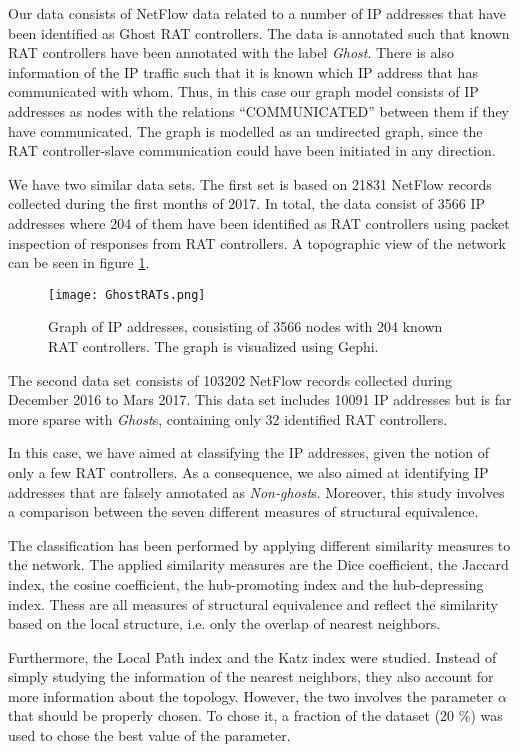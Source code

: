 Our data consists of NetFlow data related to a number of IP addresses that have been identified as Ghost RAT controllers. The data is annotated such that known RAT controllers have been annotated with the label \textit{Ghost}. There is also information of the IP traffic such that it is known which IP address that has communicated with whom. Thus, in this case our graph model consists of IP addresses as nodes with the relations ``COMMUNICATED'' between them if they have communicated. The graph is modelled as an undirected graph, since the RAT controller-slave communication could have been initiated in any direction.

We have two similar data sets. The first set is based on 21831 NetFlow records collected during the first months of 2017. In total, the data consist of 3566 IP addresses where 204 of them have been identified as RAT controllers using packet inspection of responses from RAT controllers. A topographic view of the network can be seen in figure \ref{ip1}.

\begin{figure}[h!]
    \centering
    \texttt{[image: GhostRATs.png]}
    \caption{Graph of IP addresses, consisting of 3566 nodes with 204 known RAT controllers. The graph is visualized using Gephi.}
    \label{ip1}
\end{figure}

The second data set consists of 103202 NetFlow records collected during December 2016 to Mars 2017. This data set includes 10091 IP addresses but is far more sparse with \textit{Ghost}s, containing only 32 identified RAT controllers. 

In this case, we have aimed at classifying the IP addresses, given the notion of only a few RAT controllers. As a consequence, we also aimed at identifying IP addresses that are falsely annotated as \textit{Non-ghost}s. Moreover, this study involves a comparison between the seven different measures of structural equivalence. 

The classification has been performed by applying different similarity measures to the network. The applied similarity measures are the Dice coefficient, the Jaccard index, the cosine coefficient, the hub-promoting index and the hub-depressing index. Thess are all measures of structural equivalence and reflect the similarity based on the local structure, i.e. only the overlap of nearest neighbors.

Furthermore, the Local Path index and the Katz index were studied. Instead of simply studying the information of the nearest neighbors, they also account for more information about the topology. However, the two involves the parameter $\alpha$ that should be properly chosen. To chose it, a fraction of the dataset (20 \%) was used to chose the best value of the parameter. 

